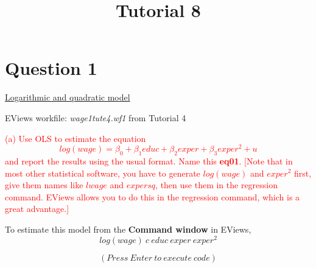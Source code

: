 \documentclass[12pt]{report}
\title{Tutorial 8}
\subtitle
{
	\textbf{keywords}: binary variables, dummy variables, intercept, slope, conditional expectation, regression line, F-test, prediction intervals, prediction uncertainty, estimation uncertainty, variation in error, sum of squared residuals, confidence intervals, standard errors
	
	\textbf{estimated reading time}: 36 minutes
}
\begin{document}
	
\maketitle

\newpage
\section*{Question 1}
\noindent \uline{Logarithmic and quadratic model}

\noindent EViews workfile: \textit{wage1tute4.wf1} from Tutorial 4

\noindent \textcolor{red}
{
	(a) Use OLS to estimate the equation
	$$log(wage) = \beta_0 + \beta_1educ + \beta_2exper + \beta_3exper^2 + u$$
	and report the results using the usual format. Name this \textbf{eq01}. [Note that in most other statistical software, you have to generate $log(wage)$ and $exper^2$ first, give them names like $lwage$ and $expersq$, then use them in the regression command. EViews allows you to do this in the regression command, which is a great advantage.]
}

\noindent To estimate this model from the \textbf{Command window} in EViews,
$$log(wage)\ c\ educ\ exper\ exper^2$$
\begin{figure}[H]
	\centering
\end{figure}
\vspace{-\baselineskip}
\noindent $$(Press\ Enter\ to\ execute\ code)$$
\end{document}
